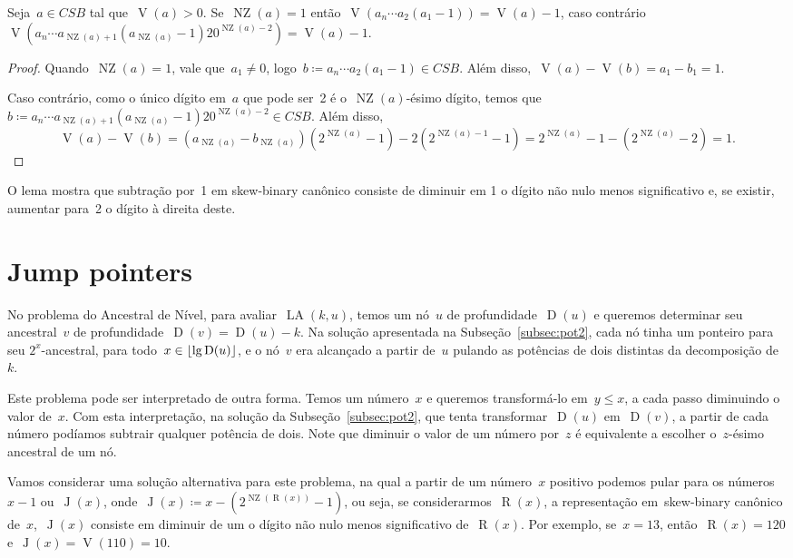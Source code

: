 \documentclass[main.tex]{subfiles}
\newcommand{\LA}{\operatorname{LA}}
\newcommand{\Dep}{\operatorname{D}}
\newcommand{\NZ}{\operatorname{NZ}}
\newcommand{\CSB}{\textit{CSB}}
\renewcommand{\V}{\operatorname{V}}
\newcommand{\R}{\operatorname{R}}
\newcommand{\J}{\operatorname{J}}
\begin{document}
\begin{lemma} \label{lem:csbsub}
	Seja~$a \in \CSB$ tal que~$\V(a) > 0$. Se~$\NZ(a) = 1$ então~$\V(a_n \cdots a_2 (a_1-1)) = \V(a) - 1$, caso contrário~${\V(a_n \cdots a_{\NZ(a)+1} (a_{\NZ(a)} - 1) 2 0^{\NZ(a) - 2}) = \V(a) - 1}$.
\end{lemma}
\begin{proof}
	Quando~$\NZ(a) = 1$, vale que~$a_1 \neq 0$, logo~${b \coloneqq a_n \cdots a_2 (a_1-1) \in \CSB}$. Além disso,~${\V(a) - \V(b) = a_1 - b_1 = 1}$.

	Caso contrário, como o único dígito em~$a$ que pode ser~2 é o~$\NZ(a)$-ésimo dígito, temos que~${b \coloneqq a_n \cdots a_{\NZ(a)+1} (a_{\NZ(a)} - 1) 2 0^{\NZ(a) - 2} \in \CSB}$. Além disso,
	$$ \V(a) - \V(b) = (a_{\NZ(a)} - b_{\NZ(a)}) (2^{\NZ(a)} - 1) - 2 (2^{\NZ(a) - 1} - 1) = 2^{\NZ(a)} - 1 - (2^{\NZ(a)} - 2) = 1. $$
\end{proof}

O lema mostra que subtração por~1 em skew-binary canônico consiste de diminuir em 1 o dígito não nulo menos significativo e, se existir, aumentar para~2 o dígito à direita deste.

\section{Jump pointers}

No problema do Ancestral de Nível, para avaliar~$\LA(k, u)$, temos um nó~$u$ de profundidade~$\Dep(u)$ e queremos determinar seu ancestral~$v$ de profundidade~${\Dep(v) = \Dep(u) - k}$. Na solução apresentada na Subseção~\ref{subsec:pot2}, cada nó tinha um ponteiro para seu $2^x$-ancestral, para todo~${x \in \floor{\lg\Dep(u)}}$, e o nó~$v$ era alcançado a partir de~$u$ pulando as potências de dois distintas da decomposição de~$k$.

Este problema pode ser interpretado de outra forma. Temos um número~$x$ e queremos transformá-lo em~$y \leq x$, a cada passo diminuindo o valor de~$x$. Com esta interpretação, na solução da Subseção~\ref{subsec:pot2}, que tenta transformar~$\Dep(u)$ em~$\Dep(v)$, a partir de cada número podíamos subtrair qualquer potência de dois. Note que diminuir o valor de um número por~$z$ é equivalente a escolher o~$z$-ésimo ancestral de um nó.

Vamos considerar uma solução alternativa para este problema, na qual a partir de um número~$x$ positivo podemos pular para os números~$x-1$ ou~$\J(x)$, onde~${\J(x) \coloneqq x - (2^{\NZ(\R(x))} - 1)}$, ou seja, se considerarmos~$\R(x)$, a representação em~skew-binary canônico de~$x$,~$\J(x)$ consiste em diminuir de um o dígito não nulo menos significativo de~$\R(x)$. Por exemplo, se~$x = 13$, então~${\R(x) = 120}$ e~${\J(x) = \V(110) = 10}$.
\end{document}
